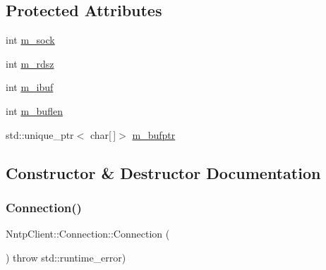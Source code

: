 \subsection*{Protected Attributes}
\begin{DoxyCompactItemize}
\item 
int \hyperlink{class_nntp_client_1_1_connection_a617eb80b423c28d3f7feaff839787e3e}{m\+\_\+sock}
\item 
int \hyperlink{class_nntp_client_1_1_connection_a04d0a1dc3f7df1d80599002ec7c74b4b}{m\+\_\+rdsz}
\item 
int \hyperlink{class_nntp_client_1_1_connection_a3890026e452ddbd58f184734ddd1f036}{m\+\_\+ibuf}
\item 
int \hyperlink{class_nntp_client_1_1_connection_ac976a7e92125e6c8751a06faf1a323b6}{m\+\_\+buflen}
\item 
std\+::unique\+\_\+ptr$<$ char\mbox{[}$\,$\mbox{]}$>$ \hyperlink{class_nntp_client_1_1_connection_a4a3885811f0cfe873c8091bc659fb23a}{m\+\_\+bufptr}
\end{DoxyCompactItemize}


\subsection{Constructor \& Destructor Documentation}
\hypertarget{class_nntp_client_1_1_connection_adcf4522afd5361bf7c27a1c00825585a}{}\label{class_nntp_client_1_1_connection_adcf4522afd5361bf7c27a1c00825585a} 
\subsubsection{\texorpdfstring{Connection()}{Connection()}\hspace{0.1cm}{\footnotesize\ttfamily [1/4]}}
{\footnotesize\ttfamily Nntp\+Client\+::\+Connection\+::\+Connection (\begin{DoxyParamCaption}{ }\end{DoxyParamCaption}) throw  std\+::runtime\+\_\+error) }

\hypertarget{class_nntp_client_1_1_connection_a78f4aedbe993d16ff65b850a3683de2c}{}\label{class_nntp_client_1_1_connection_a78f4aedbe993d16ff65b850a3683de2c} 
